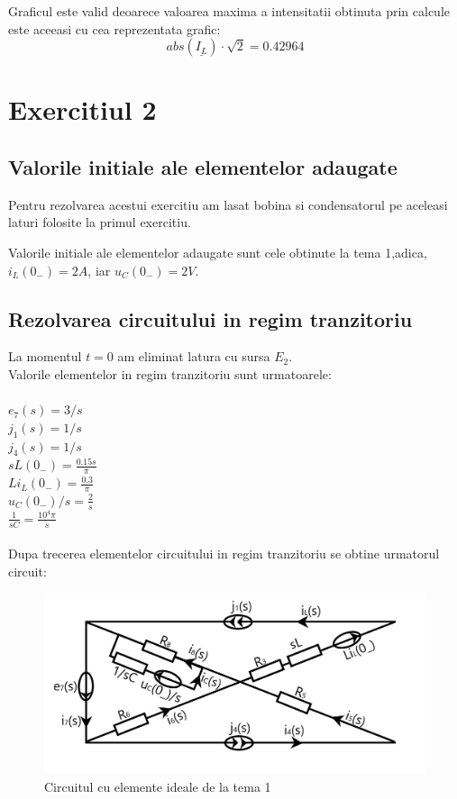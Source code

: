 \documentclass[12pt,titlepage,a4paper]{article}
\begin{document}
Graficul este valid deoarece valoarea maxima a intensitatii obtinuta prin calcule este aceeasi cu cea reprezentata grafic:
$$abs(\underline{I_L}) \cdot \sqrt{2} = 0.42964$$


\section{Exercitiul 2}
\subsection{Valorile initiale ale elementelor adaugate}

Pentru rezolvarea acestui exercitiu am lasat bobina si condensatorul pe aceleasi laturi folosite la primul exercitiu.

Valorile initiale ale elementelor adaugate sunt cele obtinute la tema 1,adica, $i_L(0_-) = 2A$, iar $u_C(0_-) = 2V$.

\subsection{Rezolvarea circuitului in regim tranzitoriu}

La momentul $t = 0$ am eliminat latura cu sursa $E_2$. \\

Valorile elementelor in regim tranzitoriu sunt urmatoarele:\\\\
$e_7(s) = 3/s$\\
$j_1(s) = 1/s$\\
$j_4(s) = 1/s$\\
$sL(0_-) = \frac{0.15s}{\pi}$\\
$Li_L(0_-) = \frac{0.3}{\pi}$\\
$u_C(0_-)/s = \frac{2}{s}$\\
$\frac{1}{sC} = \frac{10^4\pi}{s}$\\
\\

Dupa trecerea elementelor circuitului in regim tranzitoriu se obtine urmatorul circuit:\\

\begin{figure}[h!]
\begin{center} 
\hypertarget{C2}{}
\includegraphics[width=14cm]{4.png}
\caption{Circuitul cu elemente ideale de la tema 1}\label{fig1a}
\end{center}
\end{figure}
\end{document}
